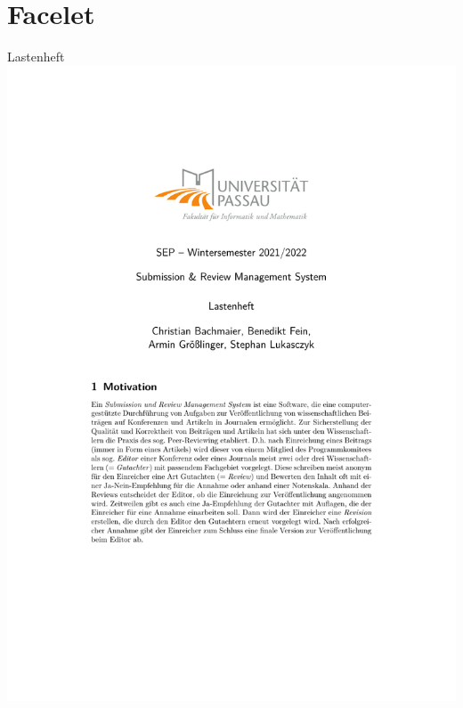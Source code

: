 \documentclass{beamer}
\begin{document}
    \section{Facelet}
    \begin{frame}{Lastenheft}
        \centering
        \includegraphics[height=1.1\textheight]{../../docs/Lastenheft/lastenheft}
    \end{frame}
\end{document}
